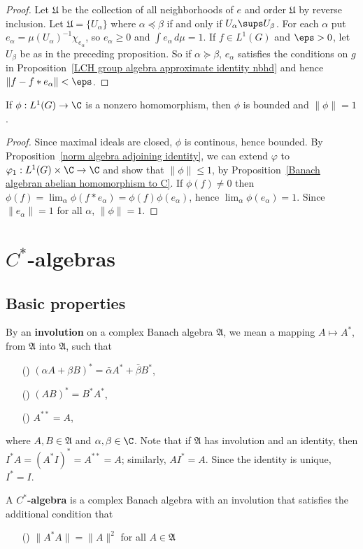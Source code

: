 \begin{proof}
Let $\mathfrak{U}$ be the collection of all neighborhoods of $e$ and order $\mathfrak{U}$ by reverse inclusion. Let $\mathfrak{U}=\{U_\alpha\}$ where $\alpha\preceq\beta$ if and only if $U_\alpha\sups U_\beta$. For each $\alpha$ put $e_\alpha=\mu(U_\alpha)^{-1}\chi_{e_\alpha}$, so $e_\alpha\geq 0$ and $\int e_\alpha\,d\mu=1$. If $f\in L^1(G)$ and $\eps>0$, let $U_\beta$ be as in the preceding proposition. So if $\alpha\succeq\beta$, $e_\alpha$ satisfies the conditions on $g$ in Proposition~\ref{LCH group algebra approximate identity nbhd} and hence $\|f-f\ast e_\alpha\|<\eps$.
\end{proof}
\begin{corollary}\label{LCH group algebra homomorphism to C}
If $\phi:L^1(G)\to\C$ is a nonzero homomorphism, then $\phi$ is bounded and $\|\phi\|=1$.
\end{corollary}
\begin{proof}
Since maximal ideals are closed, $\phi$ is continous, hence bounded. By Proposition~\ref{norm algebra adjoining identity}, we can extend $\varphi$ to $\varphi_1:L^1(G)\times\C\to\C$ and show that $\|\phi\|\leq 1$, by Proposition~\ref{Banach algebran abelian homomorphism to C}. If $\phi(f)\neq 0$ then $\phi(f)=\lim_\alpha\phi(f\ast e_\alpha)=\phi(f)\phi(e_\alpha)$, hence $\lim_\alpha\phi(e_\alpha)=1$. Since $\|e_\alpha\|=1$ for all $\alpha$, $\|\phi\|=1$.
\end{proof}
\section{\boldmath$C^*$-algebras}
\subsection{Basic properties}
By an \textbf{involution} on a complex Banach algebra $\mathfrak{A}$, we mean a mapping $A\mapsto A^*$, from $\mathfrak{A}$ into $\mathfrak{A}$, such that
\begin{itemize}
\item[(\rmnum{1})] $(\alpha A+\beta B)^*=\bar{\alpha}A^*+\bar{\beta}B^*$,
\item[(\rmnum{2})] $(AB)^*=B^*A^*$,
\item[(\rmnum{3})] $A^{**}=A$,
\end{itemize}
where $A,B\in\mathfrak{A}$ and $\alpha,\beta\in\C$. Note that if $\mathfrak{A}$ has involution and an identity, then $I^*A=(A^*I)^*=A^{**}=A$; similarly, $AI^*=A$. Since the identity is unique, $I^*=I$.\par
A \textbf{$C^*$-algebra} is a complex Banach algebra with an involution that satisfies the additional condition that
\begin{itemize}
\item[(\rmnum{4})] $\|A^*A\|=\|A\|^2$ for all $A\in\mathfrak{A}$
\end{itemize}

